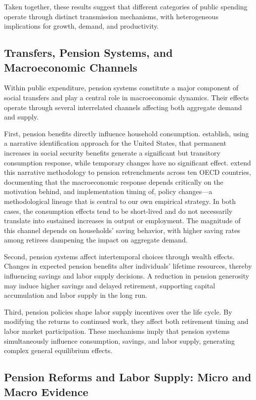 \documentclass[11pt,english,a4paper, twoside, authoryear]{article}
\begin{document}
Taken together, these results suggest that different categories of public spending operate through distinct transmission mechanisms, with heterogeneous implications for growth, demand, and productivity.

\subsection{Transfers, Pension Systems, and Macroeconomic Channels}

Within public expenditure, pension systems constitute a major component of social transfers and play a central role in macroeconomic dynamics. Their effects operate through several interrelated channels affecting both aggregate demand and supply.

First, pension benefits directly influence household consumption. \citet{RomerRomer2016} establish, using a narrative identification approach for the United States, that permanent increases in social security benefits generate a significant but transitory consumption response, while temporary changes have no significant effect. \citet{BiZubairy2023} extend this narrative methodology to pension retrenchments across ten OECD countries, documenting that the macroeconomic response depends critically on the motivation behind, and implementation timing of, policy changes---a methodological lineage that is central to our own empirical strategy. In both cases, the consumption effects tend to be short-lived and do not necessarily translate into sustained increases in output or employment. The magnitude of this channel depends on households' saving behavior, with higher saving rates among retirees dampening the impact on aggregate demand.

Second, pension systems affect intertemporal choices through wealth effects. Changes in expected pension benefits alter individuals' lifetime resources, thereby influencing savings and labor supply decisions. A reduction in pension generosity may induce higher savings and delayed retirement, supporting capital accumulation and labor supply in the long run.

Third, pension policies shape labor supply incentives over the life cycle. By modifying the returns to continued work, they affect both retirement timing and labor market participation. These mechanisms imply that pension systems simultaneously influence consumption, savings, and labor supply, generating complex general equilibrium effects.

\subsection{Pension Reforms and Labor Supply: Micro and Macro Evidence}
\end{document}

